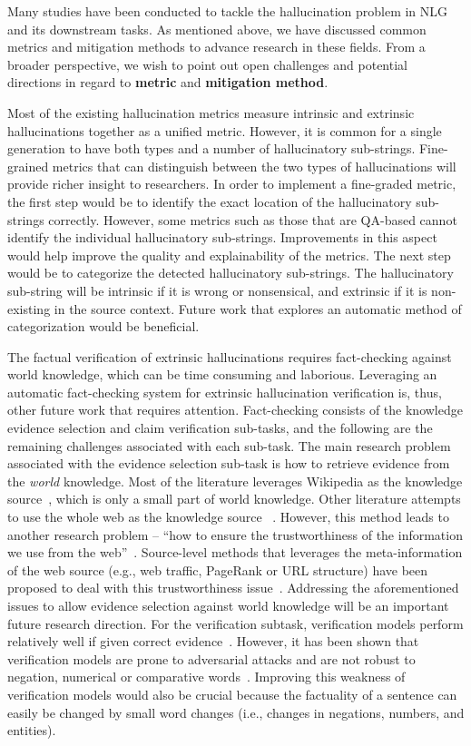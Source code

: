 \label{section:futurework}
Many studies have been conducted to tackle the hallucination problem in NLG and its downstream tasks. 
As mentioned above, we have discussed common metrics and mitigation methods to advance research in these fields.
From a broader perspective, we wish to point out open challenges and potential directions in regard to \textbf{metric} and \textbf{mitigation method}.



Most of the existing hallucination metrics measure intrinsic and extrinsic hallucinations together as a unified metric. However, it is common for a single generation to have both types and a number of hallucinatory sub-strings. Fine-grained metrics that can distinguish between the two types of hallucinations will provide richer insight to researchers.
In order to implement a fine-graded metric, the first step would be to identify the exact location of the hallucinatory sub-strings correctly. However, some metrics such as those that are QA-based cannot identify the individual hallucinatory sub-strings. Improvements in this aspect would help improve the quality and explainability of the metrics. 
The next step would be to categorize the detected hallucinatory sub-strings. The hallucinatory sub-string will be intrinsic if it is wrong or nonsensical, and extrinsic if it is non-existing in the source context. Future work that explores an automatic method of categorization would be beneficial.

The factual verification of extrinsic hallucinations requires fact-checking against world knowledge, which can be time consuming and laborious.
Leveraging an automatic fact-checking system for extrinsic hallucination verification is, thus, other future work that requires attention.
Fact-checking consists of the knowledge evidence selection and claim verification sub-tasks, and the following are the remaining challenges associated with each sub-task. 
The main research problem associated with the evidence selection sub-task is how to retrieve evidence from the \textit{world} knowledge. Most of the literature leverages Wikipedia as the knowledge source~, which is only a small part of world knowledge. Other literature attempts to use the whole web as the knowledge source
~. However, this method leads to another research problem -- ``how to ensure the trustworthiness of the information we use from the web''~. Source-level methods that leverages the meta-information of the web source (e.g., web traffic, PageRank or URL structure) have been proposed to deal with this trustworthiness issue~.
Addressing the aforementioned issues to allow evidence selection against world knowledge will be an important future research direction.
For the verification subtask, verification models perform relatively well if given correct evidence~. However, it has been shown that verification models are prone to adversarial attacks and are not robust to negation, numerical or comparative words~.
Improving this weakness of verification models would also be crucial because the factuality of a sentence can easily be changed by small word changes (i.e., changes in negations, numbers, and entities).

